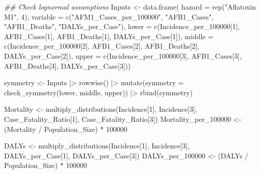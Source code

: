 \documentclass[
  letterpaper,
  DIV=11,
  numbers=noendperiod]{scrartcl}
\newenvironment{Shaded}{\begin{snugshade}}{\end{snugshade}}
\newcommand{\AttributeTok}[1]{\textcolor[rgb]{0.40,0.45,0.13}{#1}}
\newcommand{\DecValTok}[1]{\textcolor[rgb]{0.68,0.00,0.00}{#1}}
\newcommand{\DocumentationTok}[1]{\textcolor[rgb]{0.37,0.37,0.37}{\textit{#1}}}
\newcommand{\FunctionTok}[1]{\textcolor[rgb]{0.28,0.35,0.67}{#1}}
\newcommand{\NormalTok}[1]{\textcolor[rgb]{0.00,0.23,0.31}{#1}}
\newcommand{\OtherTok}[1]{\textcolor[rgb]{0.00,0.23,0.31}{#1}}
\newcommand{\SpecialCharTok}[1]{\textcolor[rgb]{0.37,0.37,0.37}{#1}}
\newcommand{\StringTok}[1]{\textcolor[rgb]{0.13,0.47,0.30}{#1}}
\begin{document}
\begin{Shaded}
\begin{Highlighting}[]
\DocumentationTok{\#\# Check lognormal assumptions}
\NormalTok{Inputs }\OtherTok{\textless{}{-}} \FunctionTok{data.frame}\NormalTok{(}
 \AttributeTok{hazard =} \FunctionTok{rep}\NormalTok{(}\StringTok{"Aflatoxin M1"}\NormalTok{,  }\DecValTok{4}\NormalTok{), }
 \AttributeTok{variable =} \FunctionTok{c}\NormalTok{(}\StringTok{"AFM1\_Cases\_per\_100000"}\NormalTok{,  }\StringTok{"AFB1\_Cases"}\NormalTok{, }\StringTok{"AFB1\_Deaths"}\NormalTok{,  }\StringTok{"DALYs\_per\_Case"}\NormalTok{), }
 \AttributeTok{lower =} \FunctionTok{c}\NormalTok{(Incidence\_per\_100000[}\DecValTok{1}\NormalTok{],  AFB1\_Cases[}\DecValTok{1}\NormalTok{],  AFB1\_Deaths[}\DecValTok{1}\NormalTok{],  DALYs\_per\_Case[}\DecValTok{1}\NormalTok{]), }
 \AttributeTok{middle =} \FunctionTok{c}\NormalTok{(Incidence\_per\_100000[}\DecValTok{2}\NormalTok{],  AFB1\_Cases[}\DecValTok{2}\NormalTok{],  AFB1\_Deaths[}\DecValTok{2}\NormalTok{],  DALYs\_per\_Case[}\DecValTok{2}\NormalTok{]), }
 \AttributeTok{upper =} \FunctionTok{c}\NormalTok{(Incidence\_per\_100000[}\DecValTok{3}\NormalTok{],  AFB1\_Cases[}\DecValTok{3}\NormalTok{],  AFB1\_Deaths[}\DecValTok{3}\NormalTok{],  DALYs\_per\_Case[}\DecValTok{3}\NormalTok{]))}

\NormalTok{symmetry }\OtherTok{\textless{}{-}}\NormalTok{ Inputs }\SpecialCharTok{|\textgreater{}}
 \FunctionTok{rowwise}\NormalTok{() }\SpecialCharTok{|\textgreater{}}
 \FunctionTok{mutate}\NormalTok{(}\AttributeTok{symmetry =} \FunctionTok{check\_symmetry}\NormalTok{(lower,  middle,  upper)) }\SpecialCharTok{|\textgreater{}} 
 \FunctionTok{rbind}\NormalTok{(symmetry)}

\NormalTok{Mortality }\OtherTok{\textless{}{-}} \FunctionTok{multiply\_distributions}\NormalTok{(Incidence[}\DecValTok{1}\NormalTok{], Incidence[}\DecValTok{3}\NormalTok{], Case\_Fatality\_Ratio[}\DecValTok{1}\NormalTok{], Case\_Fatality\_Ratio[}\DecValTok{3}\NormalTok{])}
\NormalTok{Mortality\_per\_100000 }\OtherTok{\textless{}{-}}\NormalTok{ (Mortality }\SpecialCharTok{/}\NormalTok{ Population\_Size) }\SpecialCharTok{*} \DecValTok{100000}

\NormalTok{DALYs }\OtherTok{\textless{}{-}} \FunctionTok{multiply\_distributions}\NormalTok{(Incidence[}\DecValTok{1}\NormalTok{], Incidence[}\DecValTok{3}\NormalTok{], DALYs\_per\_Case[}\DecValTok{1}\NormalTok{], DALYs\_per\_Case[}\DecValTok{3}\NormalTok{])}
\NormalTok{DALYs\_per\_100000 }\OtherTok{\textless{}{-}}\NormalTok{ (DALYs }\SpecialCharTok{/}\NormalTok{ Population\_Size) }\SpecialCharTok{*} \DecValTok{100000}


\end{Highlighting}
\end{Shaded}
\end{document}
